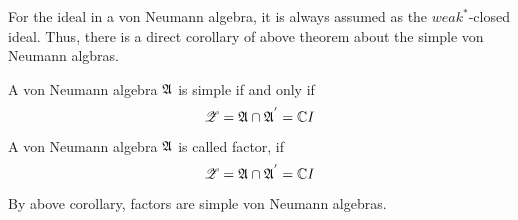 For the ideal in a von Neumann algebra, it is always assumed as the $weak^*$-closed ideal. Thus, there is a direct corollary of above theorem about the simple von Neumann algbras.

\begin{cor}
		A von Neumann algebra $\mathfrak{A}$ is simple if and only if 
		\begin{equation*}
			\mathscr{Z} = \mathfrak{A} \cap \mathfrak{A}^{'} = \mathbb{C} I
		\end{equation*}
\end{cor}

\begin{defn}
	A von Neumann algebra $\mathfrak{A}$ is called factor, if 
	\begin{equation*}
		\mathscr{Z} = \mathfrak{A} \cap \mathfrak{A}^{'} = \mathbb{C} I
	\end{equation*}
\end{defn}
\begin{rem}
	By above corollary, factors are simple von Neumann algebras.
\end{rem}




















